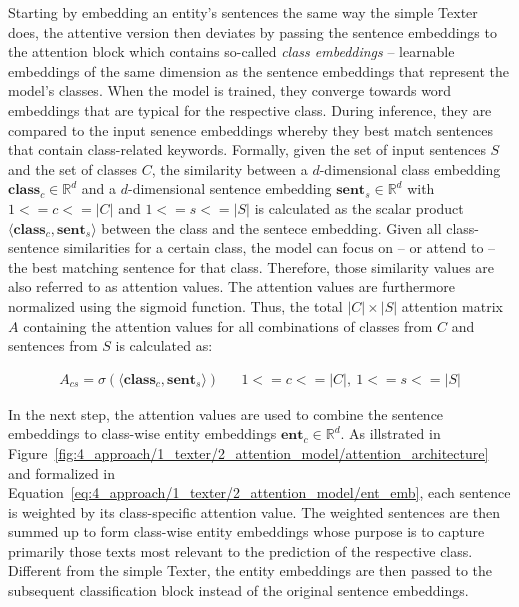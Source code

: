 Starting by embedding an entity's sentences the same way the simple Texter does, the attentive version then deviates by passing the sentence embeddings to the attention block which contains so-called \emph{class embeddings} -- learnable embeddings of the same dimension as the sentence embeddings that represent the model's classes. When the model is trained, they converge towards word embeddings that are typical for the respective class. During inference, they are compared to the input senence embeddings whereby they best match sentences that contain class-related keywords. Formally, given the set of input sentences $S$ and the set of classes $C$, the similarity between a $d$-dimensional class embedding $\textbf{class}_c \in \mathbb{R}^d$ and a $d$-dimensional sentence embedding $\textbf{sent}_s \in \mathbb{R}^d$ with $1 <= c <= |C|$ and $1 <= s <= |S|$ is calculated as the scalar product $\langle \textbf{class}_c, \textbf{sent}_s \rangle$ between the class and the sentece embedding. Given all class-sentence similarities for a certain class, the model can focus on -- or attend to -- the best matching sentence for that class. Therefore, those similarity values are also referred to as attention values. The attention values are furthermore normalized using the sigmoid function. Thus, the total $|C| \times |S|$ attention matrix $A$ containing the attention values for all combinations of classes from $C$ and sentences from $S$ is calculated as:

\begin{align}
    A_{cs} = \sigma(\langle \textbf{class}_c , \textbf{sent}_s \rangle) && 1 <= c <= |C|,~1 <= s <= |S|
    \label{eq:4_approach/1_texter/2_attention_model/attention_matrix}
\end{align}

In the next step, the attention values are used to combine the sentence embeddings to class-wise entity embeddings $\textbf{ent}_c \in \mathbb{R}^d$. As illstrated in Figure~\ref{fig:4_approach/1_texter/2_attention_model/attention_architecture} and formalized in Equation~\ref{eq:4_approach/1_texter/2_attention_model/ent_emb}, each sentence is weighted by its class-specific attention value. The weighted sentences are then summed up to form class-wise entity embeddings whose purpose is to capture primarily those texts most relevant to the prediction of the respective class. Different from the simple Texter, the entity embeddings are then passed to the subsequent classification block instead of the original sentence embeddings.

